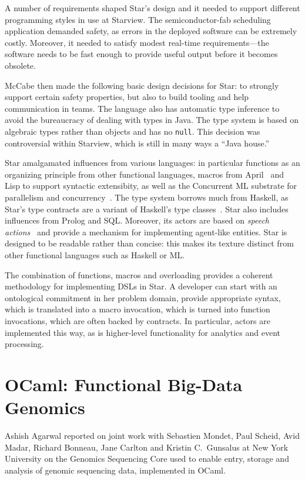 \documentclass{jfp1}
\begin{document}
A number of requirements shaped Star's design and it needed to support
different programming styles in use at Starview.  The
semiconductor-fab scheduling application demanded safety, as errors in
the deployed software can be extremely costly.  Moreover, it needed to
satisfy modest real-time requirements---the software needs to be fast
enough to provide useful output before it becomes obsolete.

McCabe then made the following basic design decisions for Star: to
strongly support certain safety properties, but also to build tooling
and help communication in teams.  The language also has automatic type
inference to avoid the bureaucracy of dealing with types in Java.
The type system is based on algebraic types rather than objects and has no
\texttt{null}. This decision was controversial within Starview,
which is still in many ways a ``Java house.''

Star amalgamated influences from various languages: in particular
functions as an organizing principle from other functional languages,
macros from April~\cite{fgm-klc:95} and Lisp to support syntactic
extensibity, as well as the Concurrent ML substrate for parallelism
and concurrency~\cite{Reppy1999}.  The type system borrows much from
Haskell, as Star's type contracts are a variant of Haskell's type
classes~\cite{WadlerBlott1989}.  Star also includes influences from
Prolog and SQL.  Moreover, its actors are based on \textit{speech
  actions}~\cite{searle:69} and provide a mechanism for implementing
agent-like entities. Star is designed to be readable rather than
concise: this makes its texture distinct from other functional
languages such as Haskell or ML.

The combination of functions, macros and overloading provides a
coherent methodology for implementing DSLs in Star.  A developer can
start with an ontological commitment in her problem domain, provide
appropriate syntax, which is translated into a macro invocation, which
is turned into function invocations, which are often backed by
contracts.  In particular, actors are implemented this way, as is
higher-level functionality for analytics and event processing.

\section{OCaml: Functional Big-Data Genomics}

Ashish Agarwal reported on joint work with Sebastien Mondet, Paul
Scheid, Avid Madar, Richard Bonneau, Jane Carlton and Kristin
C.\ Gunsalus at New York University on the Genomics Sequencing Core used
to enable entry, storage and analysis of genomic sequencing data,
implemented in OCaml.
\end{document}
